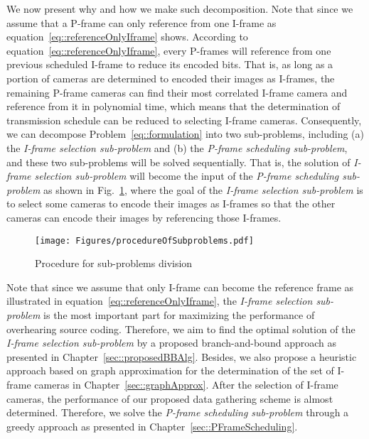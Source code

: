 We now present why and how we make such decomposition.
Note that since we assume that a P-frame can only reference from one I-frame as equation~\eqref{eq::referenceOnlyIframe} shows.
According to equation~\eqref{eq::referenceOnlyIframe}, every P-frames will reference from one previous scheduled I-frame to reduce its encoded bits.
That is, as long as a portion of cameras are determined to encoded their images as I-frames, the remaining P-frame cameras can find their most correlated I-frame camera and reference from it in polynomial time, which means that the determination of transmission schedule can be reduced to selecting I-frame cameras.
Consequently, we can decompose Problem~\eqref{eq::formulation} into two sub-problems, including (a) the \emph{I-frame selection sub-problem} and (b) the \emph{P-frame scheduling sub-problem}, and these two sub-problems will be solved sequentially.
That is, the solution of \emph{I-frame selection sub-problem} will become the input of the \emph{P-frame scheduling sub-problem} as shown in Fig.~\ref{fig::subProbProcedure}, where the goal of the \emph{I-frame selection sub-problem} is to select some cameras to encode their images as I-frames so that the other cameras can encode their images by referencing those I-frames.
%
\begin{figure}
\begin{center}
\texttt{[image: Figures/procedureOfSubproblems.pdf]}
\caption{\label{fig::subProbProcedure}Procedure for sub-problems division}
\end{center}
\end{figure}
%

Note that since we assume that only I-frame can become the reference frame as illustrated in equation~\eqref{eq::referenceOnlyIframe}, the \emph{I-frame selection sub-problem} is the most important part for maximizing the performance of overhearing source coding.
Therefore, we aim to find the optimal solution of the \emph{I-frame selection sub-problem} by a proposed branch-and-bound approach as presented in Chapter~\ref{sec::proposedBBAlg}.
Besides, we also propose a heuristic approach based on graph approximation for the determination of the set of I-frame cameras in Chapter~\ref{sec::graphApprox}.
After the selection of I-frame cameras, the performance of our proposed data gathering scheme is almost determined.
Therefore, we solve the \emph{P-frame scheduling sub-problem} through a greedy approach as presented in Chapter~\ref{sec::PFrameScheduling}.